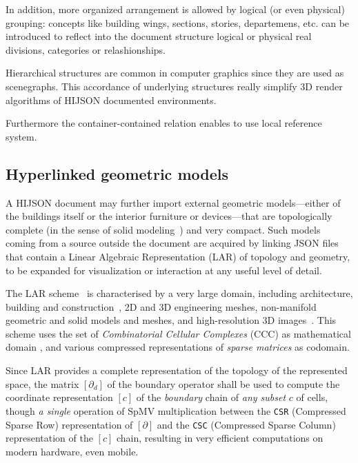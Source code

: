 \documentclass{sig-alternate}
\begin{document}
In addition, more organized arrangement is allowed by logical (or even
physical)  grouping: concepts like building wings, sections, stories,
departemens, etc. can be  introduced to reflect into the document structure
logical or physical real divisions,  categories or relashionships.

Hierarchical structures are common in computer graphics since they are used as
scenegraphs. This accordance of underlying structures really simplify 3D
render algorithms of HIJSON documented environments.

Furthermore the container-contained relation enables to use local reference system.


\subsection{Hyperlinked geometric models}\label{optional-lar}

A HIJSON document may further import external geometric models---either of the buildings itself or the interior furniture or devices---that are topologically complete (in the sense of solid modeling~\cite{Requicha:1980:RRS:356827.356833}) and very compact. 
Such models coming from a source outside the document are acquired by linking JSON files that contain a Linear Algebraic Representation (LAR) of topology and geometry, to be expanded for visualization or interaction at any useful level of detail. 

The LAR scheme~\cite{Dicarlo:2014:TNL:2543138.2543294} is characterised by a very large domain, including architecture, building and construction~\cite{paoluzziMS:2014}, 2D and 3D engineering meshes, non-manifold geometric and solid models and meshes, and high-resolution 3D images~\cite{cadanda:2015}. This scheme uses the set of \emph{Combinatorial Cellular Complexes} (CCC) as mathematical domain
\cite{Basak:2010}, and various compressed representations of \emph{sparse matrices} \cite{gemmexp} as codomain. 

Since LAR provides a complete representation of the topology of the represented space,
the matrix  $[\partial_d]$ of the boundary operator shall be used to compute the coordinate representation $[c]$ of the \emph{boundary} chain of \emph{any subset} $c$ of cells, though \emph{a single} operation of SpMV multiplication \cite{gemmexp} between the \texttt{CSR} (Compressed Sparse Row) representation of $[\partial]$ and the \texttt{CSC} (Compressed Sparse Column) representation of the $[c]$ chain, resulting in very efficient computations on modern hardware, even mobile.
\end{document}
